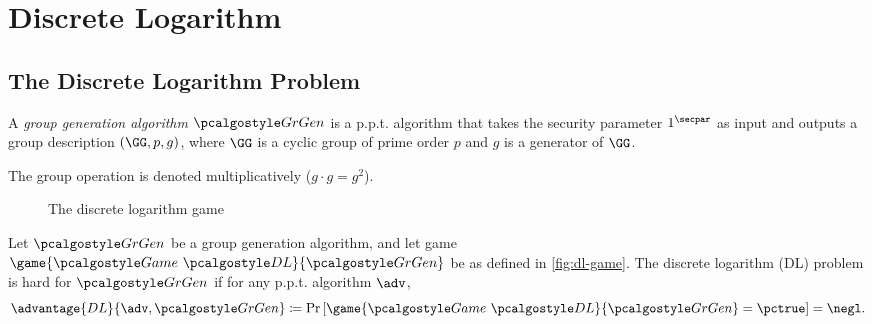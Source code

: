 \section{Discrete Logarithm}\label{sec:discrete-log}

\subsection{The Discrete Logarithm Problem}

\begin{definition}
  A \emph{group generation algorithm} $\grgen$ is a p.p.t. algorithm that takes the security parameter $1^\secpar$ as input and outputs a group description $(\GG, p, g)$, where $\GG$ is a cyclic group of prime order $p$ and $g$ is a generator of $\GG$.
\end{definition}

\begin{remark}
  The group operation is denoted multiplicatively ($g\cdot g = g^2$).
\end{remark}


\begin{figure}[tbhp]
  \begin{center}
    \begin{tcolorbox}[width=5cm]
      \begin{pchstack}[center]
      \end{pchstack}
    \end{tcolorbox}
  \end{center}
  \caption{The discrete logarithm game\label{fig:dl-game}}
\end{figure}

\begin{definition}
  Let $\grgen$ be a group generation algorithm, and let game $\game{\Game~\algo{DL}}{\grgen}$ be as defined in \autoref{fig:dl-game}.
  The discrete logarithm (DL) problem is hard for $\grgen$ if for any p.p.t. algorithm $\adv$,
  \[
  \advantage{DL}{\adv, \grgen} \defeq \pr{\game{\Game~\algo{DL}}{\grgen} = \pctrue} = \negl.
  \]
\end{definition}

